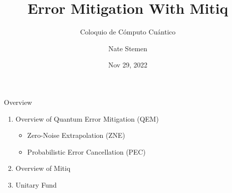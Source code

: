 \documentclass[11pt,aspectratio=1610,xcolor=dvipsnames]{beamer}
\title{Error Mitigation With Mitiq}
\subtitle{Coloquio de Cómputo Cuántico}
\date{Nov 29, 2022}
\author{Nate Stemen}
\begin{document}
\maketitle

\begin{frame}{Overview}
	\begin{enumerate}
		\item Overview of Quantum Error Mitigation (QEM)
		      \begin{itemize}
			      \item Zero-Noise Extrapolation (ZNE)
			      \item Probabilistic Error Cancellation (PEC)
		      \end{itemize}
		\item Overview of Mitiq
		\item Unitary Fund
	\end{enumerate}
\end{frame}
\end{document}
